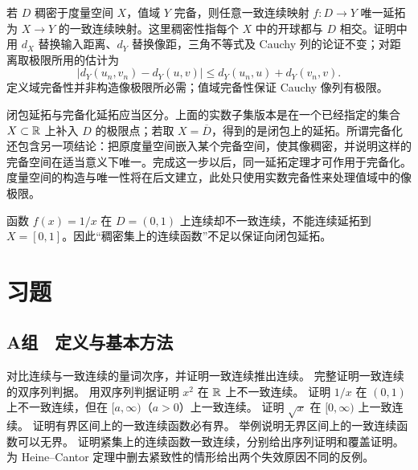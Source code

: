 \begin{remark}[度量空间版本]
若 \(D\) 稠密于度量空间 \(X\)，值域 \(Y\) 完备，则任意一致连续映射 \(f:D\to Y\) 唯一延拓为 \(X\to Y\) 的一致连续映射。这里稠密性指每个 \(X\) 中的开球都与 \(D\) 相交。证明中用 \(d_X\) 替换输入距离、\(d_Y\) 替换像距，三角不等式及 Cauchy 列的论证不变；对距离取极限所用的估计为
\[
 |d_Y(u_n,v_n)-d_Y(u,v)|\le d_Y(u_n,u)+d_Y(v_n,v).
\]
定义域完备性并非构造像极限所必需；值域完备性保证 Cauchy 像列有极限。
\end{remark}

闭包延拓与完备化延拓应当区分。上面的实数子集版本是在一个已经指定的集合 \(X\subset\mathbb{R}\) 上补入 \(D\) 的极限点；若取 \(X=\overline D\)，得到的是闭包上的延拓。所谓完备化还包含另一项结论：把原度量空间嵌入某个完备空间，使其像稠密，并说明这样的完备空间在适当意义下唯一。完成这一步以后，同一延拓定理才可作用于完备化。度量空间的构造与唯一性将在后文建立，此处只使用实数完备性来处理值域中的像极限。

\begin{counterexample}
函数 \(f(x)=1/x\) 在 \(D=(0,1)\) 上连续却不一致连续，不能连续延拓到 \(X=[0,1]\)。因此“稠密集上的连续函数”不足以保证向闭包延拓。
\end{counterexample}

\section*{习题}

\subsection*{A组　定义与基本方法}
\begin{enumerate}[label=\textbf{\thechapter.\arabic*.}]
  对比连续与一致连续的量词次序，并证明一致连续推出连续。
  完整证明一致连续的双序列判据。
  用双序列判据证明 \(x^2\) 在 \(\mathbb{R}\) 上不一致连续。
  证明 \(1/x\) 在 \((0,1)\) 上不一致连续，但在 \([a,\infty)\)（\(a>0\)）上一致连续。
  证明 \(\sqrt x\) 在 \([0,\infty)\) 上一致连续。
  证明有界区间上的一致连续函数必有界。
  举例说明无界区间上的一致连续函数可以无界。
  证明紧集上的连续函数一致连续，分别给出序列证明和覆盖证明。
  为 Heine--Cantor 定理中删去紧致性的情形给出两个失效原因不同的反例。
\end{enumerate}

